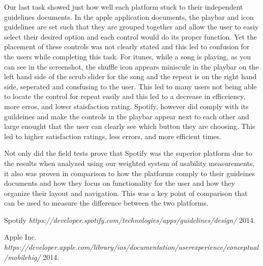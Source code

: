 \documentclass[a4paper]{article}
\begin{document}
Our last task showed just how well each platform stuck to their independent guidelines documents. In the apple application documents, the playbar and icon guidelines are set such that they are grouped together and allow the user to easiy select their desired option and each control would do its proper function. Yet the placement of these controls was not clearly stated and this led to confusion for the users while completing this task. For itunes, while a song is playing, as you can see in the screenshot, the shuffle icon appears miniscule in the playbar on the left hand side of the scrub slider for the song and the repeat is on the right hand side, seperated and consfusing to the user. This led to many users not being able to locate the control for repeat easily and this led to a decrease in efficeiency, more erros, and lower staisfaction rating. Spotify, however did comply with its guildeines and make the controls in the playbar appear next to each other and large enought that the user can clearly see which button they are choosing. This led to higher satisfaction ratings, less errors, and more efficient times.

Not only did the field tests prove that Spotify was the superior platform due to the results when analyzed using our weighted system of usability measurements, it also was proven in comparison to how the platforms comply to their guideines documents and how they focus on functionality for the user and how they organize their layout and navigation. This was a key point of comparison that can be used to measure the difference between the two platforms.

\begin{thebibliography}{1}

 Spotify {\em https://developer.spotify.com/technologies/apps/guidelines/design/}  2014.

  Apple Inc. {\em https://developer.apple.com/library/ios/documentation/userexperience/conceptual/mobilehig/}
2014.
\end{thebibliography}
\end{document}
